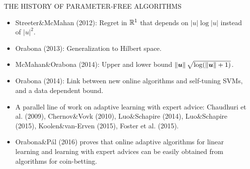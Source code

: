 \documentclass[final,t,serif,mathserif]{beamer}
\def\spazioo{\vspace{-0.3cm}}
\begin{document}
\begin{frame}{}
\begin{columns}[t]
\begin{column}{.33\linewidth}
    \begin{block}{THE HISTORY OF PARAMETER-FREE ALGORITHMS}
    \spazioo
    \begin{itemize}
    \item Streeter\&McMahan (2012): Regret in $\mathbb{R}^1$ that depends on $|u| \log|u|$ instead of $|u|^2$.
    \item Orabona (2013): Generalization to Hilbert space.
    \item McMahan\&Orabona (2014): Upper and lower bound $\left\|{\boldsymbol{u}}\right\| \sqrt{\log(\left\|{\boldsymbol{u}}\right\|+1)}$.
    \item Orabona (2014): Link between new online algorithms and self-tuning SVMs, and a data dependent bound.
    \item A parallel line of work on adaptive learning with expert advice: Chaudhuri et al. (2009), Chernov\&Vovk (2010), Luo\&Schapire (2014), Luo\&Schapire (2015), Koolen\&van-Erven (2015), Foster et al. (2015).
    \item Orabona\&P\'al (2016) proves that online adaptive algorithms for linear learning and learning with expert advices can be easily obtained from algorithms for coin-betting.
    \end{itemize}
    \spazioo

    \end{block}



\end{column}
\end{columns}
\end{frame}
\end{document}
